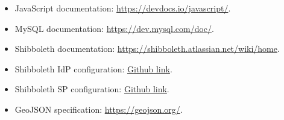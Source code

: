 \begin{itemize}
    \item JavaScript documentation: \href{https://devdocs.io/javascript/}{https://devdocs.io/javascript/}.
    \item MySQL documentation: \href{https://dev.mysql.com/doc/}{https://dev.mysql.com/doc/}.
    \item Shibboleth documentation: \href{https://shibboleth.atlassian.net/wiki/home}{https://shibboleth.atlassian.net/wiki/home}.
    \item Shibboleth IdP configuration: \href{https://github.com/ConsortiumGARR/idem-tutorials/blob/master/idem-fedops/HOWTO-Shibboleth/Identity\%20Provider/Fedora/HOWTO\%20Install\%20and\%20Configure\%20a\%20Shibboleth\%20IdP\%20v3.2.1\%20on\%20Linux\%20Fedora\%2024\%20Server\%20Edition\%20with\%20Apache2\%20\%2B\%20Jetty9.md}{Github link}.
    \item Shibboleth SP configuration: \href{https://github.com/ConsortiumGARR/idem-tutorials/blob/master/idem-fedops/HOWTO-Shibboleth/Service\%20Provider/Debian/HOWTO\%20Install\%20and\%20Configure\%20a\%20Shibboleth\%20SP\%20v3.x\%20on\%20Debian-Ubuntu\%20Linux.md}{Github link}.
    \item GeoJSON specification: \href{https://geojson.org/}{https://geojson.org/}.
\end{itemize}
